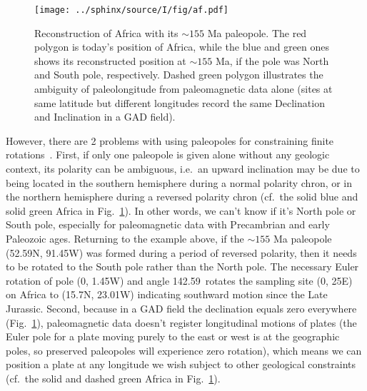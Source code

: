 \begin{figure}[!ht]
  \centering
    \texttt{[image: ../sphinx/source/I/fig/af.pdf]}
  \captionsetup{width=.95\textwidth}
  \caption[The hemispheric ambiguity and absolute paleolongitude indeterminacy
  with a single paleomagnetic pole (paleopole)]{Reconstruction of Africa with
  its ${\sim}155$ Ma paleopole. The red polygon is today's position of Africa,
  while the blue and green ones shows its reconstructed position at ${\sim}155$
  Ma, if the pole was North and South pole, respectively. Dashed green polygon
  illustrates the ambiguity of paleolongitude from paleomagnetic data alone
  (sites at same latitude but different longitudes record the same Declination
  and Inclination in a GAD field).}\label{Fig:chap_intro_reconstructpole}
\end{figure}

However, there are 2 problems with using paleopoles for constraining finite
rotations~\citep{T20}. First, if only one paleopole is given alone without any
geologic context, its polarity can be ambiguous, i.e.\ an upward inclination may
be due to being located in the southern hemisphere during a normal polarity
chron, or in the northern hemisphere during a reversed polarity chron (cf.\ the
solid blue and solid green Africa in Fig.~\ref{Fig:chap_intro_reconstructpole}).
In other words, we can't know if it's North pole or South pole, especially for
paleomagnetic data with Precambrian and early Paleozoic ages. Returning to the
example above, if the ${\sim}155$ Ma paleopole (52.59\degree{}N,
91.45\degree{}W) was formed during a period of reversed polarity, then it needs
to be rotated to the South pole rather than the North pole. The necessary Euler
rotation of pole (0\degree, 1.45\degree{}W) and angle 142.59\degree\ rotates the
sampling site (0\degree, 25\degree{}E) on Africa to (15.7\degree{}N,
23.01\degree{}W) indicating southward motion since the Late Jurassic. Second,
because in a GAD field the declination equals zero everywhere
(Fig.~\ref{Fig:chap_intro_reconstructpole}), paleomagnetic data doesn't register
longitudinal motions of plates (the Euler pole for a plate moving purely to the
east or west is at the geographic poles, so preserved paleopoles will experience
zero rotation), which means we can position a plate at any longitude we wish
subject to other geological constraints (cf.\ the solid and dashed green Africa
in Fig.~\ref{Fig:chap_intro_reconstructpole}).

